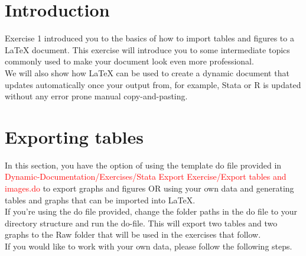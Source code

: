 \documentclass[12pts]{article}
\begin{document}
	\begin{minipage}{\textwidth}
		
	\section*{Introduction}
	Exercise 1 introduced you to the basics of how to import tables and figures to a {\LaTeX} document. This exercise will introduce you to some intermediate topics commonly used to make your document look even more professional.\\
	
	We will also show how {\LaTeX} can be used to create a dynamic document that updates automatically once your output from, for example, Stata or R is updated without any error prone manual copy-and-pasting.
	
	
	
	\section{Exporting tables}
	In this section, you have the option of using the template do file provided in \textcolor{red}{Dynamic-Documentation/Exercises/Stata Export Exercise/Export tables and images.do} to export graphs and figures OR using your own data and generating tables and graphs that can be imported into {\LaTeX}. \\
	
	If you're using the do file provided, change the folder paths in the do file to your directory structure and run the do-file. This will export two tables and two graphs to the Raw folder that will be used in the exercises that follow.  \\
	
	If you would like to work with your own data, please follow the following steps. \\
	

\end{minipage}
\end{document}
